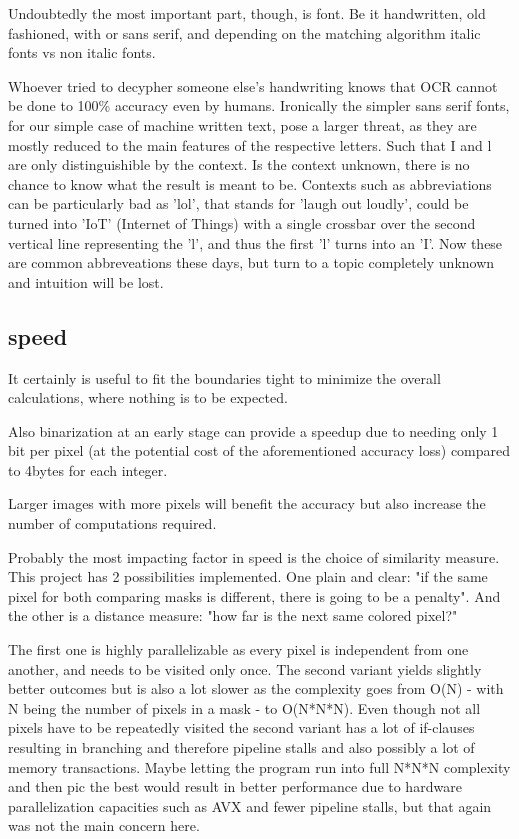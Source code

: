 Undoubtedly the most important part, though, is font. Be it handwritten, old fashioned, with or sans serif, and depending on the matching algorithm italic fonts vs non italic fonts.

Whoever tried to decypher someone else's handwriting knows that OCR cannot be done to 100\% accuracy even by humans. Ironically the simpler sans serif fonts, for our simple case of machine written text, pose a larger threat, as they are mostly reduced to the main features of the respective letters. Such that I and l are only distinguishible by the context. Is the context unknown, there is no chance to know what the result is meant to be. Contexts such as abbreviations can be particularly bad as 'lol', that stands for 'laugh out loudly', could be turned into 'IoT' (Internet of Things) with a single crossbar over the second vertical line representing the 'l', and thus the first 'l' turns into an 'I'. Now these are common abbreveations these days, but turn to a topic completely unknown and intuition will be lost.


\subsection {speed}
It certainly is useful to fit the boundaries tight to minimize the overall calculations, where nothing is to be expected.

Also binarization at an early stage can provide a speedup due to needing only 1 bit per pixel (at the potential cost of the aforementioned accuracy loss) compared to 4bytes for each integer.

Larger images with more pixels will benefit the accuracy but also increase the number of computations required.

Probably the most impacting factor in speed is the choice of similarity measure. This project has 2 possibilities implemented. One plain and clear: "if the same pixel for both comparing masks is different, there is going to be a penalty". And the other is a distance measure: "how far is the next same colored pixel?"

The first one is highly parallelizable as every pixel is independent from one another, and needs to be visited only once. The second variant yields slightly better outcomes but is also a lot slower as the complexity goes from O(N) - with N being the number of pixels in a mask - to O(N*N*N). Even though not all pixels have to be repeatedly visited the second variant has a lot of if-clauses resulting in branching and therefore pipeline stalls and also possibly a lot of memory transactions. Maybe letting the program run into full N*N*N complexity and then pic the best would result in better performance due to hardware parallelization capacities such as AVX and fewer pipeline stalls, but that again was not the main concern here.

